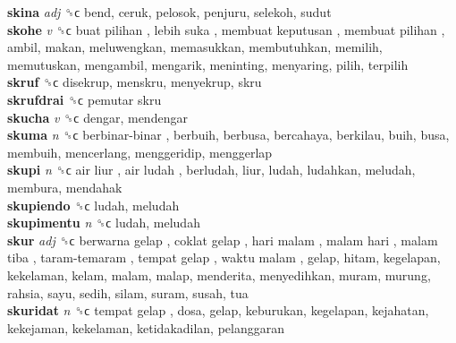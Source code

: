 \textbf{skina} \emph{adj}  ␝ϲ  bend, ceruk, pelosok, penjuru, selekoh, sudut  \\
\textbf{skohe} \emph{v}  ␝ϲ   buat pilihan ,  lebih suka ,  membuat keputusan ,  membuat pilihan , ambil, makan, meluwengkan, memasukkan, membutuhkan, memilih, memutuskan, mengambil, mengarik, meninting, menyaring, pilih, terpilih  \\
\textbf{skruf} ␝ϲ  disekrup, menskru, menyekrup, skru  \\
\textbf{skrufdrai} ␝ϲ   pemutar skru   \\
\textbf{skucha} \emph{v}  ␝ϲ  dengar, mendengar  \\
\textbf{skuma} \emph{n}  ␝ϲ   berbinar-binar , berbuih, berbusa, bercahaya, berkilau, buih, busa, membuih, mencerlang, menggeridip, menggerlap  \\
\textbf{skupi} \emph{n}  ␝ϲ   air liur ,  air ludah , berludah, liur, ludah, ludahkan, meludah, membura, mendahak  \\
\textbf{skupiendo} ␝ϲ  ludah, meludah  \\
\textbf{skupimentu} \emph{n}  ␝ϲ  ludah, meludah  \\
\textbf{skur} \emph{adj}  ␝ϲ   berwarna gelap ,  coklat gelap ,  hari malam ,  malam hari ,  malam tiba ,  taram-temaram ,  tempat gelap ,  waktu malam , gelap, hitam, kegelapan, kekelaman, kelam, malam, malap, menderita, menyedihkan, muram, murung, rahsia, sayu, sedih, silam, suram, susah, tua  \\
\textbf{skuridat} \emph{n}  ␝ϲ   tempat gelap , dosa, gelap, keburukan, kegelapan, kejahatan, kekejaman, kekelaman, ketidakadilan, pelanggaran  \\
